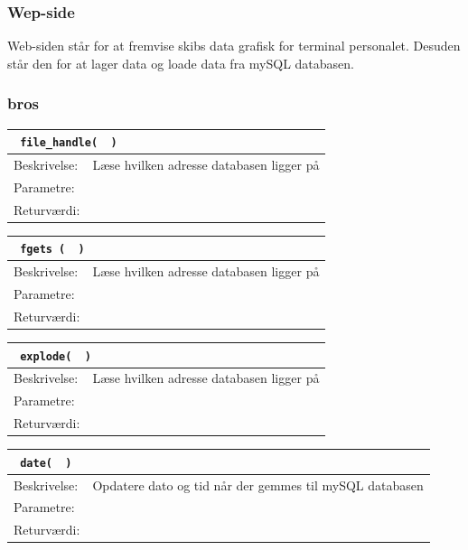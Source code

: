 \subsubsection{Wep-side}
Web-siden står for at fremvise skibs data grafisk for terminal personalet. Desuden står den for at lager data og loade data fra mySQL databasen.\\

\subsubsection{bros}

\begin{table}[H]
\begin{tabular}{l p{12.5cm}}
\multicolumn{2}{l}{\texttt{\textcolor{blue}{} file\_handle( \textcolor{blue}{} )}} \\
\hline
Beskrivelse:&Læse hvilken adresse databasen ligger på\\
Parametre:&\\
Returværdi:&\\
\end{tabular}
\end{table}

\begin{table}[H]
\begin{tabular}{l p{12.5cm}}
\multicolumn{2}{l}{\texttt{\textcolor{blue}{} fgets ( \textcolor{blue}{} )}} \\
\hline
Beskrivelse:&Læse hvilken adresse databasen ligger på\\
Parametre:&\\
Returværdi:&\\
\end{tabular}
\end{table}

\begin{table}[H]
\begin{tabular}{l p{12.5cm}}
\multicolumn{2}{l}{\texttt{\textcolor{blue}{} explode( \textcolor{blue}{} )}} \\
\hline
Beskrivelse:&Læse hvilken adresse databasen ligger på\\
Parametre:&\\
Returværdi:&\\
\end{tabular}
\end{table}

\begin{table}[H]
\begin{tabular}{l p{12.5cm}}
\multicolumn{2}{l}{\texttt{\textcolor{blue}{} date( \textcolor{blue}{} )}} \\
\hline
Beskrivelse:&Opdatere dato og tid når der gemmes til mySQL databasen\\
Parametre:&\\
Returværdi:&\\
\end{tabular}
\end{table}

